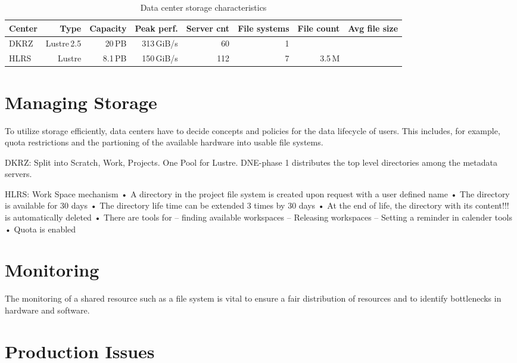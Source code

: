 \documentclass{superfri}
\numberwithin{equation}{section}
\begin{document}
\begin{table}[bt]
\renewcommand{\arraystretch}{0.8}
\renewcommand{\tabcolsep}{0.1cm}
\begin{tabular}[c]{l|r|r|r|r|r|r|r}
Center & Type        & Capacity  & Peak perf.     & Server cnt & File systems & File count    & Avg file size    \\ \hline
DKRZ   & Lustre\,2.5 & 20\,PB    & 313\,GiB/s     & 60         & 1            &               &                  \\ \hline
HLRS   & Lustre  & 8.1\,PB       & 150\,GiB/s     & 112        & 7            & 3.5\,M        & 

\end{tabular}
\caption{Data center storage characteristics\label{tbl:overviewIO}}
\end{table}

\section{Managing Storage}

To utilize storage efficiently, data centers have to decide concepts and policies for the data lifecycle of users.
This includes, for example, quota restrictions and the partioning of the available hardware into usable file systems.

DKRZ: Split into Scratch, Work, Projects. One Pool for Lustre. DNE-phase 1 distributes the top level directories among the metadata servers.

HLRS: Work Space mechanism
• A directory in the project file system is created upon request
with a user defined name
• The directory is available for 30 days
• The directory life time can be extended 3 times by 30 days
• At the end of life, the directory with its content!!! is
automatically deleted
• There are tools for
– finding available workspaces
– Releasing workspaces
– Setting a reminder in calender tools
• Quota is enabled


\section{Monitoring}
\label{sec:monitoring}

The monitoring of a shared resource such as a file system is vital to ensure a fair distribution of resources and to identify bottlenecks in hardware and software.



\section{Production Issues}
\label{sec:issues}
\end{document}
